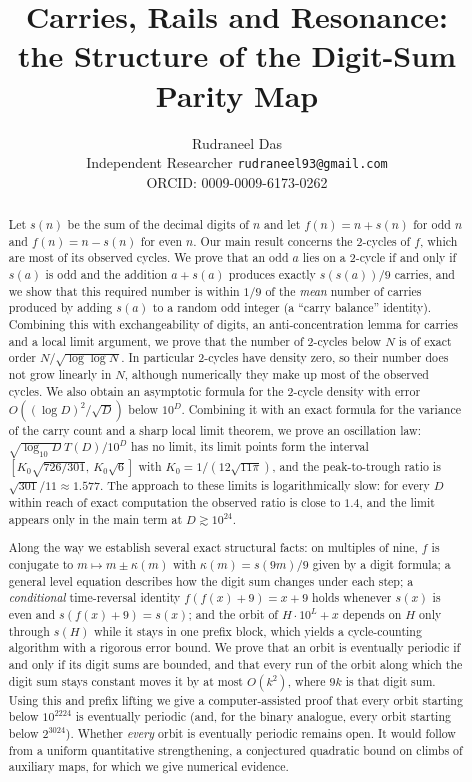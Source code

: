 \documentclass[11pt]{article}
\title{Carries, Rails and Resonance:\\ the Structure of the Digit-Sum Parity Map}
\author{Rudraneel Das\\ \small Independent Researcher \quad \texttt{rudraneel93@gmail.com}\\ \small ORCID: 0009-0009-6173-0262}
\date{}
\theoremstyle{definition}
\theoremstyle{remark}
\begin{document}
\maketitle

\begin{abstract}
Let $s(n)$ be the sum of the decimal digits of $n$ and let $f(n)=n+s(n)$ for
odd $n$ and $f(n)=n-s(n)$ for even $n$. Our main result concerns the
$2$-cycles of $f$, which are most of its observed cycles. We prove that an odd
$a$ lies on a $2$-cycle if and only if $s(a)$ is odd and the addition
$a+s(a)$ produces exactly $s(s(a))/9$ carries, and we show that this
required number is within $1/9$ of the \emph{mean} number of carries produced
by adding $s(a)$ to a random odd integer (a ``carry balance'' identity).
Combining this with exchangeability of digits, an anti-concentration lemma
for carries and a local limit argument, we prove that the number of
$2$-cycles below $N$ is of exact order $N/\sqrt{\log\log N}$. In particular
$2$-cycles have density zero, so their number does not grow linearly in
$N$, although numerically they make up most of the observed cycles. We also obtain an asymptotic formula for the $2$-cycle density with
error $O((\log D)^2/\sqrt D)$ below $10^D$. Combining it with an exact formula
for the variance of the carry count and a sharp local limit theorem, we prove
an oscillation law: $\sqrt{\log_{10}D}\,T(D)/10^D$ has no limit, its limit
points form the interval $[K_0\sqrt{726/301},\,K_0\sqrt6]$ with
$K_0=1/(12\sqrt{11\pi})$, and the peak-to-trough ratio is
$\sqrt{301}/11\approx1.577$. The approach to these limits is logarithmically
slow: for every $D$ within reach of exact computation the observed ratio is
close to $1.4$, and the limit appears only in the main term at $D\gtrsim10^{24}$.

Along the way we establish several exact structural facts: on multiples of
nine, $f$ is conjugate to $m\mapsto m\pm\kappa(m)$ with $\kappa(m)=s(9m)/9$
given by a digit formula; a general level equation describes how the digit
sum changes under each step; a \emph{conditional} time-reversal identity
$f(f(x)+9)=x+9$ holds whenever $s(x)$ is even and $s(f(x)+9)=s(x)$; and the
orbit of $H\cdot10^L+x$ depends on $H$ only through $s(H)$ while it stays in
one prefix block, which yields a cycle-counting algorithm with a rigorous
error bound. We prove that an orbit is eventually periodic if and only if its
digit sums are bounded, and that every run of the orbit along which the
digit sum stays constant moves it by at most $O(k^2)$, where $9k$ is that digit
sum. Using this and prefix lifting we give a computer-assisted proof that
every orbit starting below $10^{2224}$ is eventually periodic (and, for the
binary analogue, every orbit starting below $2^{3024}$). Whether \emph{every}
orbit is eventually periodic remains open. It would follow from a uniform
quantitative strengthening, a conjectured quadratic bound on climbs of
auxiliary maps, for which we give numerical evidence.


\end{abstract}
\end{document}
